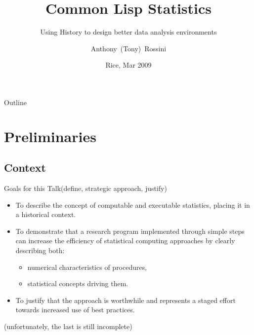 \documentclass{beamer}
\title[CLS]{Common Lisp Statistics}
\subtitle{Using History to design better data analysis environments}
\author[Rossini]{Anthony~(Tony)~Rossini}
\institute[Novartis and University of Washington] %
{
  Group Head, Modeling and Simulation\\
  Novartis Pharma AG, Switzerland
  \and
  Affiliate Assoc Prof, Biomedical and Health Informatics\\
  University of Washington, USA}
\date[Rice 09]{Rice, Mar 2009}
\begin{document}
\begin{frame}
  \titlepage
\end{frame}

\begin{frame}{Outline}
  \tableofcontents
\end{frame}




\section{Preliminaries}

\subsection{Context}

\begin{frame}{Goals for this Talk}{(define, strategic approach,
    justify)}

  \begin{itemize}
  \item To describe the concept of \alert{computable and executable
      statistics}, placing it in a historical context.

  \item To demonstrate that \alert{a research program}
    implemented through  simple steps can increase the efficiency  of
    statistical computing approaches by  clearly describing both:
    \begin{itemize}
    \item numerical characteristics of procedures,
    \item statistical concepts driving them.
    \end{itemize}

  \item To justify that the \alert{approach is worthwhile} and
    represents a staged effort towards \alert{increased use of best
      practices}.
  \end{itemize}
  (unfortunately, the last is still incomplete)
\end{frame}
\end{document}
